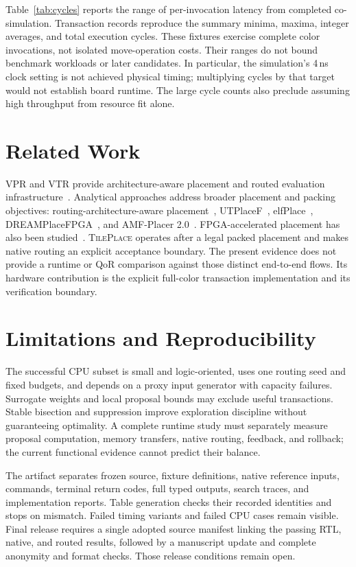 \documentclass[conference,10pt]{IEEEtran}
\newcommand{\system}{\textsc{TilePlace}}
\begin{document}
Table~\ref{tab:cycles} reports the range of per-invocation latency from
completed co-simulation. Transaction records reproduce the summary minima,
maxima, integer averages, and total execution cycles. These fixtures exercise
complete color invocations, not isolated move-operation costs. Their ranges
do not bound benchmark workloads or later candidates. In particular, the
simulation's 4\,ns clock setting is not achieved physical timing; multiplying
cycles by that target would not establish board runtime. The large cycle
counts also preclude assuming high throughput from resource fit alone.

\section{Related Work}

VPR and VTR provide architecture-aware placement and routed evaluation
infrastructure~\cite{betz1997vpr,vtr8}. Analytical approaches address broader
placement and packing objectives: routing-architecture-aware
placement~\cite{chen2015routingaware}, UTPlaceF~\cite{li2018utplacef},
elfPlace~\cite{li2019elfplace}, DREAMPlaceFPGA~\cite{rajarathnam2022dreamplacefpga},
and AMF-Placer 2.0~\cite{liang2024amf}. FPGA-accelerated placement has also
been studied~\cite{dhar2019accelerated}. \system{} operates after a legal
packed placement and makes native routing an explicit acceptance boundary.
The present evidence does not provide a runtime or QoR comparison against
those distinct end-to-end flows. Its hardware contribution is the explicit
full-color transaction implementation and its verification boundary.

\section{Limitations and Reproducibility}

The successful CPU subset is small and logic-oriented, uses one routing seed
and fixed budgets, and depends on a proxy input generator with capacity
failures. Surrogate weights and local proposal bounds may exclude useful
transactions. Stable bisection and suppression improve exploration discipline
without guaranteeing optimality. A complete runtime study must separately
measure proposal computation, memory transfers, native routing, feedback, and
rollback; the current functional evidence cannot predict their balance.

The artifact separates frozen source, fixture definitions, native reference
inputs, commands, terminal return codes, full typed outputs, search traces,
and implementation reports. Table generation checks their recorded identities
and stops on mismatch. Failed timing variants and failed CPU cases remain
visible. Final release requires a single adopted source manifest linking the
passing RTL, native, and routed results, followed by a manuscript update and
complete anonymity and format checks. Those release conditions remain open.
\end{document}
